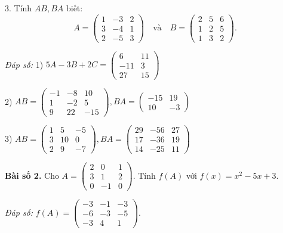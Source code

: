3. Tính \( AB, BA \) biết:
\[
A = \begin{pmatrix}
1 & -3 & 2 \\
3 & -4 & 1 \\
2 & -5 & 3
\end{pmatrix}
\quad \text{và} \quad
B = \begin{pmatrix}
2 & 5 & 6 \\
1 & 2 & 5 \\
1 & 3 & 2
\end{pmatrix}.
\]

\textit{Đáp số:}
1) \( 5A - 3B + 2C = \begin{pmatrix}
6 & 11 \\
-11 & 3 \\
27 & 15
\end{pmatrix} \)

2) \( AB = \begin{pmatrix}
-1 & -8 & 10 \\
1 & -2 & 5 \\
9 & 22 & -15
\end{pmatrix},
BA = \begin{pmatrix}
-15 & 19 \\
10 & -3
\end{pmatrix} \)

3) \( AB = \begin{pmatrix}
1 & 5 & -5 \\
3 & 10 & 0 \\
2 & 9 & -7
\end{pmatrix},
BA = \begin{pmatrix}
29 & -56 & 27 \\
17 & -36 & 19 \\
14 & -25 & 11
\end{pmatrix} \)

\textbf{Bài số 2.} Cho \( A = \begin{pmatrix}
2 & 0 & 1 \\
3 & 1 & 2 \\
0 & -1 & 0
\end{pmatrix} \). Tính \( f(A) \) với \( f(x) = x^2 - 5x + 3 \).

\textit{Đáp số:} \( f(A) = \begin{pmatrix}
-3 & -1 & -3 \\
-6 & -3 & -5 \\
-3 & 4 & 1
\end{pmatrix} \).

